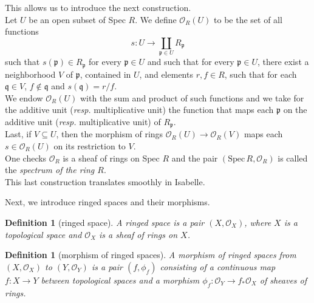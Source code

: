 \documentclass[12pt]{scrartcl}
\newtheorem{definition}[proposition]{Definition}
\begin{document}

This allows us to introduce the next construction.	\\
Let $U$ be an open subset of Spec $R$. We define $\mathscr{O}_R(U)$ to be the set of all functions 
	\[
	s: U \rightarrow \coprod \limits_{\mathfrak{p} \in U} R_{\mathfrak{p}}
	\]
such that $s(\mathfrak{p}) \in R_{\mathfrak{p}}$ for every $\mathfrak{p} \in U$ and such that for every $\mathfrak{p} \in U$, there exist a neighborhood $V$ of $\mathfrak{p}$, contained in $U$, and elements $r, f \in R$, such that for each $\mathfrak{q} \in V$, $f \notin \mathfrak{q}$ and $s(\mathfrak{q}) = r/f$. \\
We endow $\mathscr{O}_R(U)$ with the sum and product of such functions and we take for the additive unit (\textit{resp.} multiplicative unit) the function that maps each $\mathfrak{p}$ on the additive unit (\textit{resp.} multiplicative unit) of $R_{\mathfrak{p}}$. \\
Last, if $V \subseteq U$, then the morphism of rings $\mathscr{O}_R(U) \rightarrow \mathscr{O}_R(V)$ maps each $s \in \mathscr{O}_R(U)$ on its restriction to $V$. \\
One checks $\mathscr{O}_R$ is a sheaf of rings on Spec $R$ and the pair $(\text{Spec}\, R, \mathscr{O}_R)$	is called the \emph{spectrum of the ring $R$}. \\
This last construction translates smoothly in Isabelle. 

Next, we introduce ringed spaces and their morphisms.

\begin{definition}[ringed space]
	A ringed space is a pair $(X, \mathscr{O}_X)$, where $X$ is a topological space and $\mathscr{O}_X$ is a sheaf of rings on $X$.
\end{definition}


\begin{definition}[morphism of ringed spaces]
	A morphism of ringed spaces from $(X, \mathscr{O}_X)$ to $(Y, \mathscr{O}_Y)$ is a pair $(f, \phi_f)$ consisting of a continuous map $f: X \rightarrow Y$ between topological spaces and a morphism $\phi_f: \mathscr{O}_Y \rightarrow f_{*} \mathscr{O}_X$ of sheaves of rings.   
\end{definition}
\end{document}
